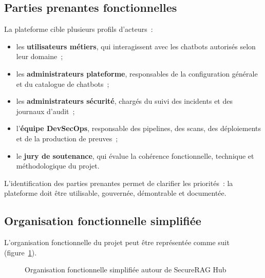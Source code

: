 \subsection{Parties prenantes fonctionnelles}

La plateforme cible plusieurs profils d'acteurs~:

\begin{itemize}
    \item les \textbf{utilisateurs métiers}, qui interagissent avec les chatbots autorisés selon leur domaine~;
    \item les \textbf{administrateurs plateforme}, responsables de la configuration générale et du catalogue de chatbots~;
    \item les \textbf{administrateurs sécurité}, chargés du suivi des incidents et des journaux d'audit~;
    \item l'\textbf{équipe DevSecOps}, responsable des pipelines, des scans, des déploiements et de la production de preuves~;
    \item le \textbf{jury de soutenance}, qui évalue la cohérence fonctionnelle, technique et méthodologique du projet.
\end{itemize}

L'identification des parties prenantes permet de clarifier les priorités~: la plateforme doit être utilisable, gouvernée, démontrable et documentée.

\subsection{Organisation fonctionnelle simplifiée}

L'organisation fonctionnelle du projet peut être représentée comme suit (figure~\ref{fig:organigramme_fonctionnel_securerag}).

\begin{figure}[htbp]
    \centering
    \caption{Organisation fonctionnelle simplifiée autour de SecureRAG Hub}
    \label{fig:organigramme_fonctionnel_securerag}
\end{figure}

